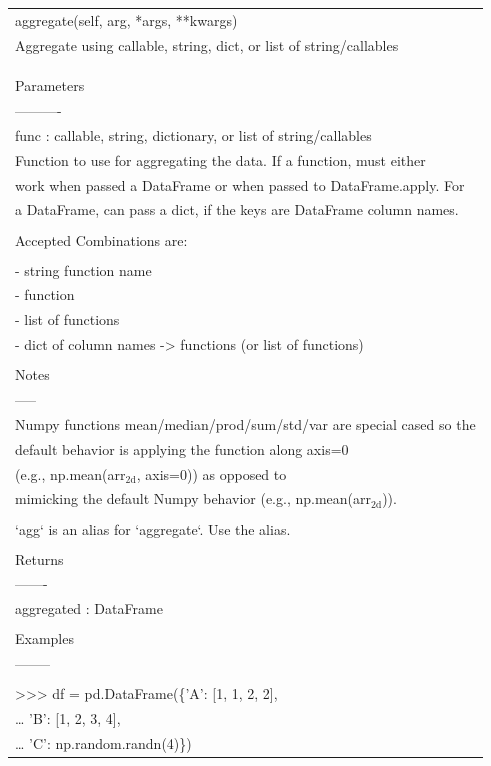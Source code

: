 \documentclass[11pt]{article}
\begin{document}
\begin{enumerate}
\begin{enumerate}
\begin{enumerate}
\begin{center}
\begin{tabular}{l}
aggregate(self, arg, *args, **kwargs)\\
Aggregate using callable, string, dict, or list of string/callables\\
\\
\\
\\
Parameters\\
----------\\
func : callable, string, dictionary, or list of string/callables\\
Function to use for aggregating the data. If a function, must either\\
work when passed a DataFrame or when passed to DataFrame.apply. For\\
a DataFrame, can pass a dict, if the keys are DataFrame column names.\\
\\
Accepted Combinations are:\\
\\
- string function name\\
- function\\
- list of functions\\
- dict of column names -> functions (or list of functions)\\
\\
Notes\\
-----\\
Numpy functions mean/median/prod/sum/std/var are special cased so the\\
default behavior is applying the function along axis=0\\
(e.g., np.mean(arr\(_{\text{2d}}\), axis=0)) as opposed to\\
mimicking the default Numpy behavior (e.g., np.mean(arr\(_{\text{2d}}\))).\\
\\
`agg` is an alias for `aggregate`. Use the alias.\\
\\
Returns\\
-------\\
aggregated : DataFrame\\
\\
Examples\\
--------\\
\\
>>> df = pd.DataFrame(\{'A': [1, 1, 2, 2],\\
\ldots{}                    'B': [1, 2, 3, 4],\\
\ldots{}                    'C': np.random.randn(4)\})\\

\end{tabular}
\end{center}
\end{enumerate}
\end{enumerate}
\end{enumerate}
\end{document}
